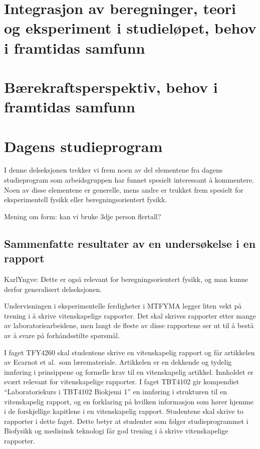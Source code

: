 \documentclass{article}
\begin{document}
\section{Integrasjon av beregninger, teori og eksperiment i studieløpet, behov i framtidas samfunn}

\section{Bærekraftsperspektiv, behov i framtidas samfunn}

\section{Dagens studieprogram}
\label{Sammenlikning}

I denne delseksjonen trekker vi frem noen av del elementene fra dagens studieprogram som arbeidsgruppen har funnet spesielt interessant å kommentere.
Noen av disse elementene er generelle, mens andre er trukket frem spesielt for eksperimentell fysikk eller beregningsorientert fysikk.

{\color{red} Mening om form: kan vi bruke 3dje person flertall?}

\subsection{Sammenfatte resultater av en undersøkelse i en rapport}
\label{Rapport}
{\color{red} KarlYngve: Dette er også relevant for beregningsorientert fysikk, og man kunne derfor generalisert delseksjonen.}

Undervisningen i eksperimentelle ferdigheter i MTFYMA legger liten vekt på trening i å skrive vitenskapelige rapporter. Det skal skrives rapporter etter mange av laboratoriearbeidene, men langt de fleste av disse rapportene ser ut til å bestå av å svare på forhåndsstilte spørsmål.

I faget TFY4260 skal studentene skrive en vitenskapelig rapport og får artikkelen av Ecarnot et al.~som læremateriale. Artikkelen er en dekkende og tydelig innføring i prinsippene og formelle krav til en vitenskapelig artikkel. Innholdet er svært relevant for vitenskapelige rapporter. I faget TBT4102 gir kompendiet ``Laboratoriekurs i TBT4102 Biokjemi 1'' en innføring i strukturen til en vitenskapelig rapport, og en forklaring på hvilken informasjon som hører hjemme i de forskjellige kapitlene i en vitenskapelig rapport. Studentene skal skrive to rapporter i dette faget. Dette betyr at studenter som følger studieprogrammet i Biofysikk og medisinsk teknologi får god trening i å skrive vitenskapelige rapporter.
\end{document}
